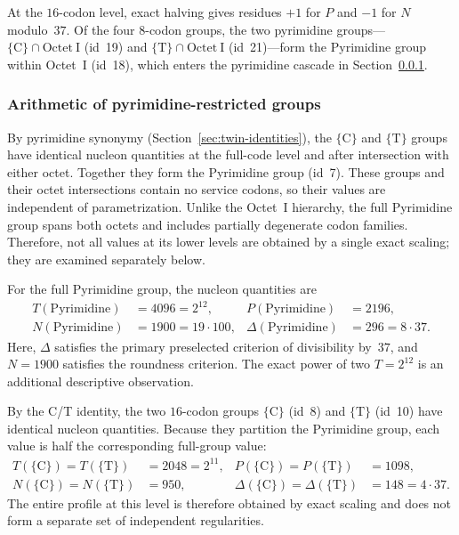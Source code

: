\documentclass[11pt,a4paper]{article}
\renewcommand{\_}{\origunderscore\allowbreak}
\begin{document}
At the $16$-codon level, exact halving gives residues $+1$ for $P$ and
$-1$ for $N$ modulo~$37$.
Of the four $8$-codon groups, the two pyrimidine groups---
$\{\mathrm{C}\} \cap \mathrm{Octet~I}$ (id~19) and
$\{\mathrm{T}\} \cap \mathrm{Octet~I}$ (id~21)---form the Pyrimidine
group within Octet~I (id~18), which enters the pyrimidine cascade in
Section~\ref{sec:results-pyrimidine}.

\subsubsection{Arithmetic of pyrimidine-restricted groups}
\label{sec:results-pyrimidine}

By pyrimidine synonymy (Section~\ref{sec:twin-identities}), the
$\{\mathrm{C}\}$ and $\{\mathrm{T}\}$ groups have identical nucleon
quantities at the full-code level and after intersection with either
octet. Together they form the Pyrimidine group (id~7). These groups and
their octet intersections contain no service codons, so their values
are independent of parametrization. Unlike the Octet~I hierarchy, the
full Pyrimidine group spans both octets and includes partially
degenerate codon families. Therefore, not all values at its lower
levels are obtained by a single exact scaling; they are examined
separately below.

For the full Pyrimidine group, the nucleon quantities are
\[
\begin{aligned}
T(\mathrm{Pyrimidine}) &= 4096 = 2^{12}, &
P(\mathrm{Pyrimidine}) &= 2196, \\
N(\mathrm{Pyrimidine}) &= 1900 = 19 \cdot 100, &
\Delta(\mathrm{Pyrimidine}) &= 296 = 8 \cdot 37.
\end{aligned}
\]
Here, $\Delta$ satisfies the primary preselected criterion of
divisibility by~$37$, and $N = 1900$ satisfies the roundness criterion.
The exact power of two $T = 2^{12}$ is an additional descriptive
observation.

By the C/T identity, the two $16$-codon groups $\{\mathrm{C}\}$
(id~8) and $\{\mathrm{T}\}$ (id~10) have identical nucleon
quantities. Because they partition the Pyrimidine group, each value is
half the corresponding full-group value:
\[
\begin{aligned}
T(\{\mathrm{C}\}) = T(\{\mathrm{T}\})
  &= 2048 = 2^{11}, &
P(\{\mathrm{C}\}) = P(\{\mathrm{T}\})
  &= 1098, \\
N(\{\mathrm{C}\}) = N(\{\mathrm{T}\})
  &= 950, &
\Delta(\{\mathrm{C}\}) = \Delta(\{\mathrm{T}\})
  &= 148 = 4 \cdot 37.
\end{aligned}
\]
The entire profile at this level is therefore obtained by exact scaling
and does not form a separate set of independent regularities.
\end{document}
